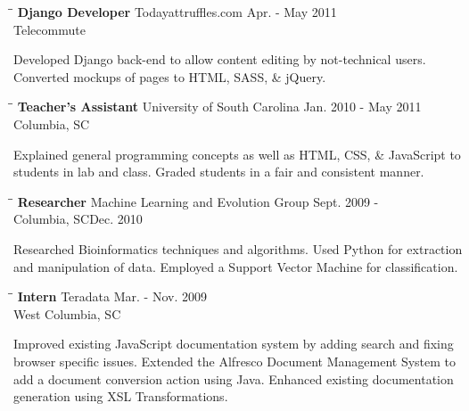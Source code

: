 \documentclass{res}
\begin{document}
\begin{resume}
    \begin{tabbing}%
   \hspace{2.3in}\= \hspace{2.6in}\= \kill %
   {\bf Django Developer}  \>Todayattruffles.com \> Apr. - May 2011\\
                          \>Telecommute
   \end{tabbing}\vspace{-20pt}
   Developed Django back-end to allow content editing by not-technical users.  Converted 
   mockups of pages to HTML, SASS, \& jQuery.
   
   \begin{tabbing}%
   \hspace{2.3in}\= \hspace{2.6in}\= \kill %
   {\bf Teacher's Assistant}  \>University of South Carolina \> Jan. 2010 - May 2011\\
                          \>Columbia, SC
   \end{tabbing}\vspace{-20pt}
   Explained general programming concepts as well as HTML, CSS, \& JavaScript to students in
   lab and class.  Graded students in a fair and consistent manner. 
   
   \begin{tabbing}%
   \hspace{2.3in}\= \hspace{2.6in}\= \kill %
   {\bf Researcher}  \>Machine Learning and Evolution Group \> Sept. 2009 - \\
                          \>Columbia, SC\>Dec. 2010
   \end{tabbing}\vspace{-20pt}
   Researched Bioinformatics techniques and algorithms.  Used Python for extraction and 
   manipulation of data.  Employed a Support Vector Machine for classification.
   
   \begin{tabbing}%
   \hspace{2.3in}\= \hspace{2.6in}\= \kill %
   {\bf Intern}  \>Teradata \> Mar. - Nov. 2009\\
                          \>West Columbia, SC
   \end{tabbing}\vspace{-20pt}
   Improved existing JavaScript documentation system by adding search and fixing browser specific
   issues.  Extended the Alfresco Document Management System to add a document conversion 
   action using Java.  Enhanced existing documentation generation using XSL Transformations.


\end{resume}
\end{document}
